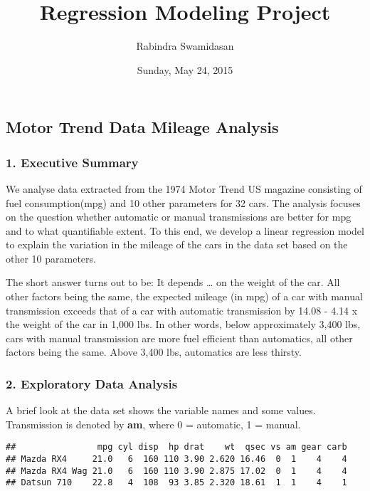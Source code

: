 \documentclass[10pt,]{article}
\title{Regression Modeling Project}
\author{Rabindra Swamidasan}
\date{Sunday, May 24, 2015}
\begin{document}
\maketitle


\subsection{Motor Trend Data Mileage
Analysis}\label{motor-trend-data-mileage-analysis}

\subsubsection{1. Executive Summary}\label{executive-summary}

We analyse data extracted from the 1974 Motor Trend US magazine
consisting of fuel consumption(mpg) and 10 other parameters for 32 cars.
The analysis focuses on the question whether automatic or manual
transmissions are better for mpg and to what quantifiable extent. To
this end, we develop a linear regression model to explain the variation
in the mileage of the cars in the data set based on the other 10
parameters.

The short answer turns out to be: It depends \ldots{} on the weight of
the car. All other factors being the same, the expected mileage (in mpg)
of a car with manual transmission exceeds that of a car with automatic
transmission by 14.08 - 4.14 x the weight of the car in 1,000 lbs. In
other words, below approximately 3,400 lbs, cars with manual
transmission are more fuel efficient than automatics, all other factors
being the same. Above 3,400 lbs, automatics are less thirsty.

\subsubsection{2. Exploratory Data
Analysis}\label{exploratory-data-analysis}

A brief look at the data set shows the variable names and some values.
Transmission is denoted by \textbf{am}, where 0 = automatic, 1 = manual.

\begin{verbatim}
##                mpg cyl disp  hp drat    wt  qsec vs am gear carb
## Mazda RX4     21.0   6  160 110 3.90 2.620 16.46  0  1    4    4
## Mazda RX4 Wag 21.0   6  160 110 3.90 2.875 17.02  0  1    4    4
## Datsun 710    22.8   4  108  93 3.85 2.320 18.61  1  1    4    1
\end{verbatim}
\end{document}
